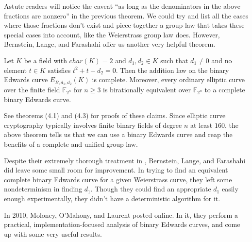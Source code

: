 Astute readers will notice the caveat ``as long as the denominators in the
    above fractions are nonzero'' in the previous theorem.
We could try and list all the cases where those fractions don't exist and piece
    together a group law that takes these special cases into account, like the
    Weierstrass group law does.
However, Bernstein, Lange, and Farashahi offer us another very helpful theorem.

\begin{thm}
Let $K$ be a field with $char(K) = 2$ and $d_1, d_2 \in K$ such that $d_1 \ne
    0$ and no element $t \in K$ satisfies $t^2 + t + d_2 = 0$.
Then the addition law on the binary Edwards curve $E_{B, d_1, d_2}(K)$ is
    complete.
Moreover, every ordinary elliptic curve over the finite field
    $\mathbb{F}_{2^n}$ for $n \ge 3$ is birationally equivalent over
    $\mathbb{F}_{2^n}$ to a complete binary Edwards curve.
\end{thm}
See theorems (4.1) and (4.3) for proofs of these claims.
Since elliptic curve cryptography typically involves finite binary fields of
    degree $n$ at least $160$, the above theorem tells us that we can use a
    binary Edwards curve and reap the benefits of a complete and unified group
    law.

Despite their extremely thorough treatment in \cite{bernstein2008binary},
    Bernstein, Lange, and Farashahi did leave some small room for improvement.
In trying to find an equivalent complete binary Edwards curve for a given
    Weierstrass curve, they left some nondeterminism in finding $d_1$.
Though they could find an appropriate $d_1$ easily enough experimentally, they
    didn't have a  deterministic algorithm for it.


In 2010, Moloney, O'Mahony, and Laurent posted \cite{moloneyefficient} online.
In it, they perform a practical, implementation-focused analysis of binary
    Edwards curves, and come up with some very useful results.

